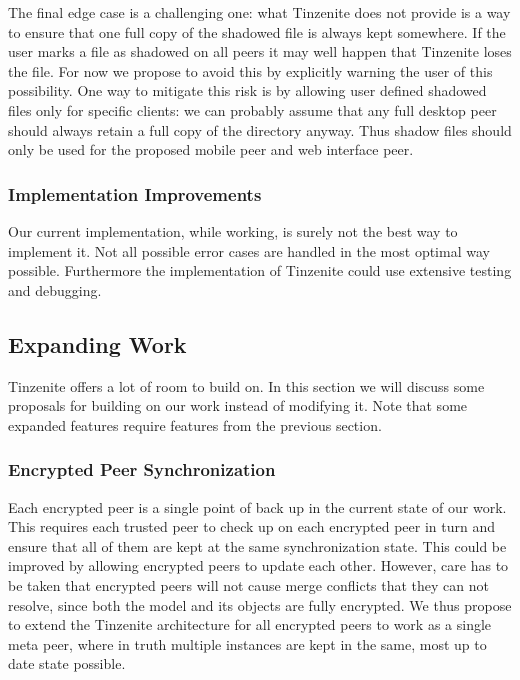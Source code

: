 The final edge case is a challenging one: what Tinzenite does not provide is a way to ensure that one full copy of the shadowed file is always kept somewhere.
If the user marks a file as shadowed on all peers it may well happen that Tinzenite loses the file.
For now we propose to avoid this by explicitly warning the user of this possibility.
One way to mitigate this risk is by allowing user defined shadowed files only for specific clients: we can probably assume that any full desktop peer should always retain a full copy of the directory anyway.
Thus shadow files should only be used for the proposed mobile peer and web interface peer.

\subsubsection{Implementation Improvements}
\label{subs:Implementation Improvements}

Our current implementation, while working, is surely not the best way to implement it.
Not all possible error cases are handled in the most optimal way possible.
Furthermore the implementation of Tinzenite could use extensive testing and debugging.

\subsection{Expanding Work}
\label{sub:Expanding Work}

Tinzenite offers a lot of room to build on.
In this section we will discuss some proposals for building on our work instead of modifying it.
Note that some expanded features require features from the previous section.

\subsubsection{Encrypted Peer Synchronization}
\label{subs:Encrypted Peer Synchronization}

Each encrypted peer is a single point of back up in the current state of our work.
This requires each trusted peer to check up on each encrypted peer in turn and ensure that all of them are kept at the same synchronization state.
This could be improved by allowing encrypted peers to update each other.
However, care has to be taken that encrypted peers will not cause merge conflicts that they can not resolve, since both the model and its objects are fully encrypted.
We thus propose to extend the Tinzenite architecture for all encrypted peers to work as a single meta peer, where in truth multiple instances are kept in the same, most up to date state possible.

